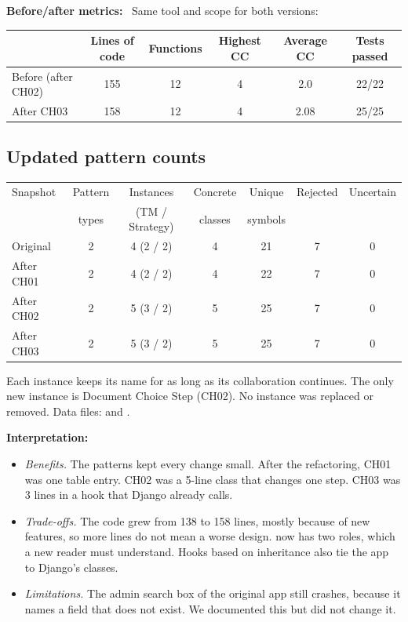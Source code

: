 \documentclass[11pt,a4paper]{article}
\newcommand{\field}[1]{\textbf{#1:}\ }
\newcommand{\code}[1]{\texttt{\detokenize{#1}}}
\begin{document}
\noindent\begin{minipage}{\linewidth}
\field{Before/after metrics} Same tool and scope for both versions:\par\smallskip
{\small\begin{tabular}{@{}lccccc@{}}\toprule
 & Lines of code & Functions & Highest CC & Average CC & Tests passed\\\midrule
Before (after CH02) & 155 & 12 & 4 & 2.0 & 22/22\\
After CH03 & 158 & 12 & 4 & 2.08 & 25/25\\\bottomrule
\end{tabular}}
\end{minipage}

\subsection{Updated pattern counts}
\begin{center}{\small\begin{tabular}{@{}lcccccc@{}}\toprule
Snapshot & Pattern & Instances & Concrete & Unique & Rejected & Uncertain\\
 & types & (TM / Strategy) & classes & symbols & & \\\midrule
Original & 2 & 4 (2 / 2) & 4 & 21 & 7 & 0\\
After CH01 & 2 & 4 (2 / 2) & 4 & 22 & 7 & 0\\
After CH02 & 2 & 5 (3 / 2) & 5 & 25 & 7 & 0\\
After CH03 & 2 & 5 (3 / 2) & 5 & 25 & 7 & 0\\\bottomrule
\end{tabular}}\end{center}

Each instance keeps its name for as long as its collaboration continues. The only new instance is Document Choice Step (CH02).
No instance was replaced or removed. Data files:  and .\par
\field{Interpretation}
\begin{itemize}
\item \emph{Benefits.} The patterns kept every change small. After the refactoring, CH01 was one table entry.
CH02 was a 5-line class that changes one step. CH03 was 3 lines in a hook that Django already calls.
\item \emph{Trade-offs.} The code grew from 138 to 158 lines, mostly because of new features, so more lines do not mean a worse design.
\code{DocumentView} now has two roles, which a new reader must understand. Hooks based on inheritance also tie the app to Django's classes.
\item \emph{Limitations.} The admin search box of the original app still crashes, because it names a field that does not exist. We documented this but did not change it.
\end{itemize}
\end{document}
